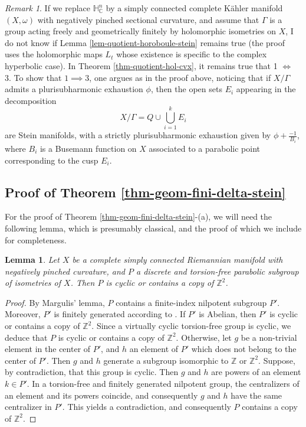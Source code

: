 \documentclass{article}
\newtheorem{lemma}[theorem]{Lemma}
\theoremstyle{definition}
\theoremstyle{remark}
\newtheorem*{remark}{Remark}
\newcommand{\C}{\mathbb{C}}
\newcommand{\Z}{\mathbb{Z}}
\newcommand{\HNC}{\mathbb{H}^{n}_{\C}}
\begin{document}
	\begin{remark}
		If we replace $\HNC$ by a simply connected complete Kähler manifold $(X,\omega)$ with negatively pinched sectional curvature, and assume that $\Gamma$ is a group acting freely and geometrically finitely by holomorphic isometries on $X$, I do not know if Lemma \ref{lem-quotient-horoboule-stein} remains true (the proof uses the holomorphic maps $L_t$ whose existence is specific to the complex hyperbolic case). In Theorem \ref{thm-quotient-hol-cvx}, it remains true that 1 $\iff$ 3. To show that $1 \implies 3$, one argues as in the proof above, noticing that if $X/\Gamma$ admits a plurisubharmonic exhaustion $\phi$, then the open sets $E_i$ appearing in the decomposition
		\begin{equation*}
			X/\Gamma = Q\cup\bigcup_{i=1}^{k}E_i
		\end{equation*}
		are Stein manifolds, with a strictly plurisubharmonic exhaustion given by $\phi+\frac{-1}{B_i}$, where $B_i$ is a Busemann function on $X$ associated to a parabolic point corresponding to the cusp $E_i$.
	\end{remark}
	
	\subsection{Proof of Theorem \ref{thm-geom-fini-delta-stein}}
	
	For the proof of Theorem \ref{thm-geom-fini-delta-stein}-(a), we will need the following lemma, which is presumably classical, and the proof of which we include for completeness.
	
	\begin{lemma}\label{lem_grp_parab_cyclique_ou_Z2}
		Let $X$ be a complete simply connected Riemannian manifold with negatively pinched curvature, and $P$ a discrete and torsion-free parabolic subgroup of isometries of $X$. Then $P$ is cyclic or contains a copy of $\Z^{2}$.
	\end{lemma}
	
	\begin{proof}
		By Margulis' lemma, $P$ contains a finite-index nilpotent subgroup $P'$. Moreover, $P'$ is finitely generated according to \cite{bowditchDiscreteParabolicGroups1993}. If $P'$ is Abelian, then $P'$ is cyclic or contains a copy of $\Z^{2}$. Since a virtually cyclic torsion-free group is cyclic, we deduce that $P$ is cyclic or contains a copy of $\Z^{2}$. Otherwise, let $g$ be a non-trivial element in the center of $P'$, and $h$ an element of $P'$ which does not belong to the center of $P'$. Then $g$ and $h$ generate a subgroup isomorphic to $\Z$ or $\Z^{2}$. Suppose, by contradiction, that this group is cyclic. Then $g$ and $h$ are powers of an element $k\in P'$. In a torsion-free and finitely generated nilpotent group, the centralizers of an element and its powers coincide, and consequently $g$ and $h$ have the same centralizer in $P'$. This  yields a contradiction, and consequently $P$ contains a copy of $\Z^{2}$.\qedhere
	\end{proof}
	
\end{document}
